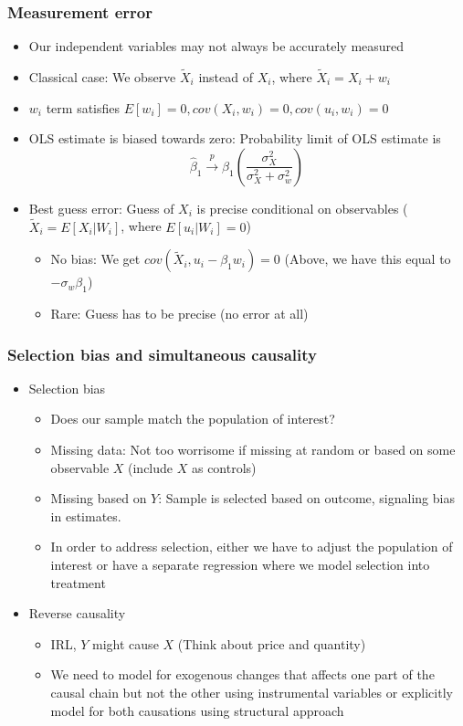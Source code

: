 \documentclass[aspectratio=169]{beamer}
\begin{document}
\begin{frame}
\frametitle{Measurement error}
\begin{itemize}
\item Our independent variables may not always be accurately measured
\item Classical case: We observe $\tilde{X}_i$ instead of $X_i$, where $\tilde{X}_i = X_i + w_i$
\item $w_i$ term satisfies $E[w_i]=0, cov(X_i,w_i)=0, cov(u_i,w_i)=0$
\item OLS estimate is biased towards zero: Probability limit of OLS estimate is
\[
\hat{\beta}_1 \xrightarrow{p} \beta_1\left(\frac{\sigma_X^2}{\sigma_X^2+\sigma_w^2} \right)\
\]
\item Best guess error: Guess of $X_i$ is precise conditional on observables ($\tilde{X}_i=E[X_i|W_i]$, where $E[u_i|W_i]=0$)
\begin{itemize}
\item No bias: We get $cov(\tilde{X}_i, u_i-\beta_1w_i)=0$ (Above, we have this equal to $-\sigma_w\beta_1$)
\item Rare: Guess has to be precise (no error at all)
\end{itemize}
\end{itemize}
\end{frame}

\begin{frame}
\frametitle{Selection bias and simultaneous causality}
\begin{itemize}
\item Selection bias
\begin{itemize}
\item Does our sample match the population of interest?
\item Missing data: Not too worrisome if missing at random or based on some observable $X$ (include $X$ as controls)
\item Missing based on $Y$: Sample is selected based on outcome, signaling bias in estimates. 
\item In order to address selection, either we have to adjust the population of interest or have a separate regression where we model selection into treatment
\end{itemize}
\item Reverse causality
\begin{itemize}
\item IRL, $Y$ might cause $X$ (Think about price and quantity)
\item We need to model for exogenous changes that affects one part of the causal chain but not the other using instrumental variables or explicitly model for both causations using structural approach
\end{itemize}
\end{itemize}
\end{frame}
\end{document}
